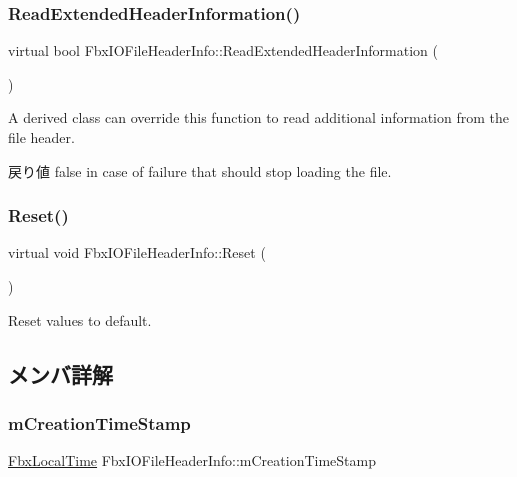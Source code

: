 \subsubsection{\texorpdfstring{Read\+Extended\+Header\+Information()}{ReadExtendedHeaderInformation()}}
{\footnotesize\ttfamily virtual bool Fbx\+I\+O\+File\+Header\+Info\+::\+Read\+Extended\+Header\+Information (\begin{DoxyParamCaption}\item[{\hyperlink{class_fbx_i_o}{Fbx\+IO} $\ast$}]{ }\end{DoxyParamCaption})\hspace{0.3cm}{\ttfamily [virtual]}}

A derived class can override this function to read additional information from the file header. \begin{DoxyReturn}{戻り値}
false in case of failure that should stop loading the file. 
\end{DoxyReturn}
\mbox{\label{class_fbx_i_o_file_header_info_aeed179cd3c2f85990eb5f7659a30ae9d}} 
\subsubsection{\texorpdfstring{Reset()}{Reset()}}
{\footnotesize\ttfamily virtual void Fbx\+I\+O\+File\+Header\+Info\+::\+Reset (\begin{DoxyParamCaption}{ }\end{DoxyParamCaption})\hspace{0.3cm}{\ttfamily [virtual]}}



Reset values to default. 



\subsection{メンバ詳解}
\mbox{\label{class_fbx_i_o_file_header_info_a48645d8ae722ebfeb290b8c1d7e6cac7}} 
\subsubsection{\texorpdfstring{m\+Creation\+Time\+Stamp}{mCreationTimeStamp}}
{\footnotesize\ttfamily \hyperlink{class_fbx_local_time}{Fbx\+Local\+Time} Fbx\+I\+O\+File\+Header\+Info\+::m\+Creation\+Time\+Stamp}

